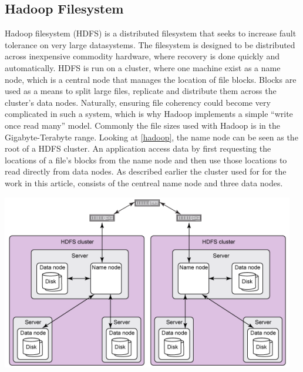 \subsection{Hadoop Filesystem}

Hadoop filesystem (HDFS) is a distributed filesystem that seeks to increase fault tolerance on very large datasystems. The filesystem is designed to be distributed across inexpensive commodity hardware, where recovery is done quickly and automatically. HDFS is run on a cluster, where one machine exist as a name node, which is a central node that manages the location of file blocks. Blocks are used as a means to split large files, replicate and distribute them across the cluster’s data nodes. Naturally, ensuring file coherency could become very complicated in such a system, which is why Hadoop implements a simple “write once read many” model. Commonly the file sizes used with Hadoop is in the Gigabyte-Terabyte range.
Looking at \cref{hadoop}, the name node can be seen as the root of a HDFS cluster. An application access data by first requesting the locations of a file’s blocks from the name node and then use those locations to read directly from data nodes. As described earlier the cluster used for for the work in this article, consists of the centreal name node and three data nodes.~\cite{hadoopIntro} 

\includegraphics[scale=1]{images/hadoopoverview.png} \label{hadoop} 